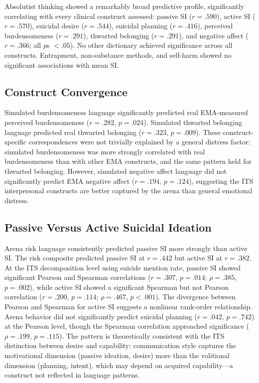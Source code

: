 \documentclass[review,12pt,authoryear]{elsarticle}
\begin{document}
Absolutist thinking showed a remarkably broad predictive profile, significantly correlating with every clinical construct assessed: passive SI ($r = .590$), active SI ($r = .570$), suicidal desire ($r = .544$), suicidal planning ($r = .416$), perceived burdensomeness ($r = .291$), thwarted belonging ($r = .291$), and negative affect ($r = .366$; all $p$s $< .05$). No other dictionary achieved significance across all constructs. Entrapment, non-substance methods, and self-harm showed no significant associations with mean SI.

\subsection{Construct Convergence}

Simulated burdensomeness language significantly predicted real EMA-measured perceived burdensomeness ($r = .282$, $p = .024$). Simulated thwarted belonging language predicted real thwarted belonging ($r = .323$, $p = .009$). These construct-specific correspondences were not trivially explained by a general distress factor: simulated burdensomeness was more strongly correlated with real burdensomeness than with other EMA constructs, and the same pattern held for thwarted belonging. However, simulated negative affect language did not significantly predict EMA negative affect ($r = .194$, $p = .124$), suggesting the ITS interpersonal constructs are better captured by the arena than general emotional distress.

\subsection{Passive Versus Active Suicidal Ideation}

Arena risk language consistently predicted passive SI more strongly than active SI. The risk composite predicted passive SI at $r = .442$ but active SI at $r = .382$. At the ITS decomposition level using suicide mention rate, passive SI showed significant Pearson and Spearman correlations ($r = .307$, $p = .014$; $\rho = .385$, $p = .002$), while active SI showed a significant Spearman but not Pearson correlation ($r = .200$, $p = .114$; $\rho = .467$, $p < .001$). The divergence between Pearson and Spearman for active SI suggests a nonlinear rank-order relationship. Arena behavior did not significantly predict suicidal planning ($r = .042$, $p = .742$) at the Pearson level, though the Spearman correlation approached significance ($\rho = .199$, $p = .115$). The pattern is theoretically consistent with the ITS distinction between desire and capability: communication style captures the motivational dimension (passive ideation, desire) more than the volitional dimension (planning, intent), which may depend on acquired capability---a construct not reflected in language patterns.
\end{document}
